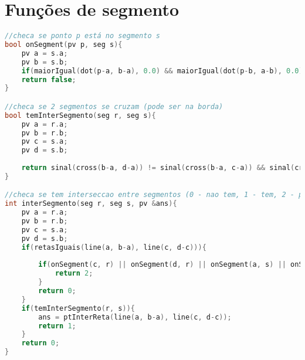 \documentclass[12pt,a4paper, twoside]{report}
\begin{document}
\section{Funções de segmento}
\noindent\begin{lstlisting}[caption=Funções de segmento,language=C++]
//checa se ponto p está no segmento s   
bool onSegment(pv p, seg s){
    pv a = s.a;
    pv b = s.b;
    if(maiorIgual(dot(p-a, b-a), 0.0) && maiorIgual(dot(p-b, a-b), 0.0) && igual(cross(p-a, p-b), 0.0)) return true;
    return false;
}

//checa se 2 segmentos se cruzam (pode ser na borda)   
bool temInterSegmento(seg r, seg s){
    pv a = r.a;
    pv b = r.b;
    pv c = s.a;
    pv d = s.b;
    
    return sinal(cross(b-a, d-a)) != sinal(cross(b-a, c-a)) && sinal(cross(d-c, a-c)) != sinal(cross(d-c, b-c));
}

//checa se tem interseccao entre segmentos (0 - nao tem, 1 - tem, 2 - paralelos (SE TOCAM MAS NAO RETORNA O PONTO) )   
int interSegmento(seg r, seg s, pv &ans){
    pv a = r.a;
    pv b = r.b;
    pv c = s.a;
    pv d = s.b;
    if(retasIguais(line(a, b-a), line(c, d-c))){
        
        if(onSegment(c, r) || onSegment(d, r) || onSegment(a, s) || onSegment(b, s)){
            return 2;
        }
        return 0;
    }
    if(temInterSegmento(r, s)){
        ans = ptInterReta(line(a, b-a), line(c, d-c));
        return 1;
    }
    return 0;
}

\end{lstlisting}
\end{document}
